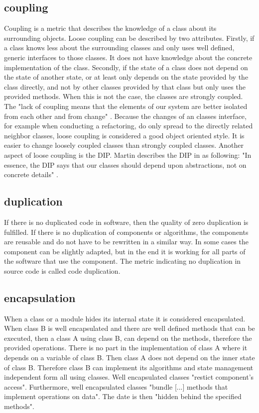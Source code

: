 \subsection{coupling}
\label{coupling}
Coupling is a metric that describes the knowledge of a class about its surrounding objects. Loose coupling can be described by two attributes. Firstly, if a class knows less about the surrounding classes and only uses well defined, generic interfaces to those classes. It does not have knowledge about the concrete implementation of the class. Secondly, if the state of a class does not depend on the state of another state, or at least only depends on the state provided by the class directly, and not by other classes provided by that class but only uses the provided methods. 
When this is not the case, the classes are strongly coupled. The "lack of coupling means that the elements of our system are better isolated from each other and from change" \cite{wiki:loosecoupling}. 
Because the changes of an classes interface, for example when conducting a refactoring, do only spread to the directly related neighbor classes, loose coupling is considered a good object oriented style. It is easier to change loosely coupled classes than strongly coupled classes. 
Another aspect of loose coupling is the \acf{DIP}. 
Martin describes the \acf{DIP} in \cite{cc} as following: "In essence, the DIP says that our classes should depend upon abstractions, not on concrete details" \cite{cc}.

\subsection{duplication}
If there is no duplicated code in software, then the quality of zero duplication is fulfilled. If there is no duplication of components or algorithms, the components are reusable and do not have to be rewritten in a similar way. In some cases the component can be slightly adapted, but in the end it is working for all parts of the software that use the component. 
The metric indicating no duplication in source code is called code duplication. 

\subsection{encapsulation}
When a class or a module hides its internal state it is considered encapsulated. When class B is well encapsulated and there are well defined methods that can be executed, then a class A using class B, can depend on the methods, therefore the provided operations. 
There is no part in the implementation of class A where it depends on a variable of class B. Then class A does not depend on the inner state of class B. Therefore class B can implement its algorithms and state management independent form all using classes. 
Well encapsulated classes "restict component's access"\cite[Encapsulation]{wiki}. Furthermore, well encapsulated classes "bundle [...] methods that implement operations on data"\cite[Encapuslation]{wiki}. The date is then "hidden behind the specified methods"\cite[Encapsulation]{wiki}.

